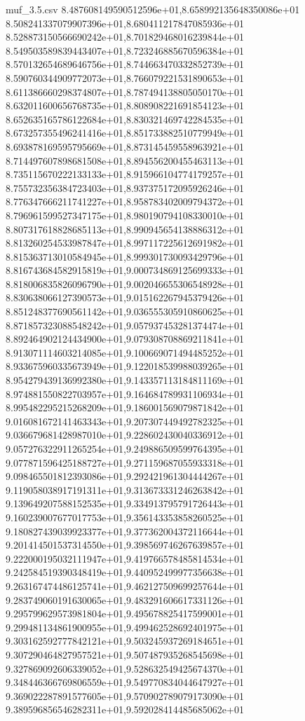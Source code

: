 \begin{filecontents*}{muf_3.5.csv}
8.487608149590512596e+01,8.658992135648350086e+01
8.508241337079907396e+01,8.680411217847085936e+01
8.528873150566690242e+01,8.701829468016239844e+01
8.549503589839443407e+01,8.723246885670596384e+01
8.570132654689646756e+01,8.744663470332852739e+01
8.590760344909772073e+01,8.766079221531890653e+01
8.611386660298374807e+01,8.787494138805050170e+01
8.632011600656768735e+01,8.808908221691854123e+01
8.652635165786122684e+01,8.830321469742284535e+01
8.673257355496241416e+01,8.851733882510779949e+01
8.693878169595795669e+01,8.873145459558963921e+01
8.714497607898681508e+01,8.894556200455463113e+01
8.735115670222133133e+01,8.915966104774179257e+01
8.755732356384723403e+01,8.937375172095926246e+01
8.776347666211741227e+01,8.958783402009794372e+01
8.796961599527347175e+01,8.980190794108330010e+01
8.807317618828685113e+01,8.990945654138886312e+01
8.813260254533987847e+01,8.997117225612691982e+01
8.815363713010584945e+01,8.999301730093429796e+01
8.816743684582915819e+01,9.000734869125699333e+01
8.818006835826096790e+01,9.002046655306548928e+01
8.830638066127390573e+01,9.015162267945379426e+01
8.851248377690561142e+01,9.036555305910860625e+01
8.871857323088548242e+01,9.057937453281374474e+01
8.892464902124434900e+01,9.079308708869211841e+01
8.913071114603214085e+01,9.100669071494485252e+01
8.933675960335673949e+01,9.122018539988039265e+01
8.954279439136992380e+01,9.143357113184811169e+01
8.974881550822703957e+01,9.164684789931106934e+01
8.995482295215268209e+01,9.186001569079871842e+01
9.016081672141463343e+01,9.207307449492782325e+01
9.036679681428987010e+01,9.228602430040336912e+01
9.057276322911265254e+01,9.249886509599764395e+01
9.077871596425188727e+01,9.271159687055933318e+01
9.098465501812393086e+01,9.292421961304444267e+01
9.119058038917191311e+01,9.313673331246263842e+01
9.139649207588152535e+01,9.334913795791726443e+01
9.160239007677017753e+01,9.356143353858260525e+01
9.180827439039923377e+01,9.377362004372116644e+01
9.201414501537314550e+01,9.398569746267639857e+01
9.222000195032111947e+01,9.419766578485814534e+01
9.242584519390348419e+01,9.440952499977356638e+01
9.263167474486125741e+01,9.462127509699257644e+01
9.283749060191630065e+01,9.483291606617331126e+01
9.295799629573981804e+01,9.495678825417599001e+01
9.299481134861900955e+01,9.499462528692401975e+01
9.303162592777842121e+01,9.503245937269184651e+01
9.307290464827957521e+01,9.507487935268545698e+01
9.327869092606339052e+01,9.528632549425674370e+01
9.348446366769806559e+01,9.549770834044647927e+01
9.369022287891577605e+01,9.570902789079173090e+01
9.389596856546282311e+01,9.592028414485685062e+01

\end{filecontents*}
